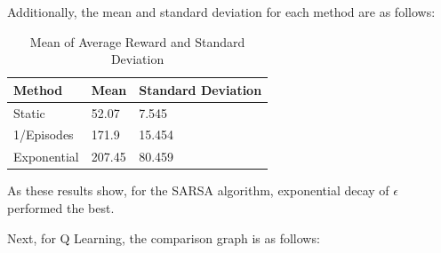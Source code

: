 Additionally, the mean and standard deviation for each method are as follows:

\begin{table}[H]
    \begin{tabular}{lll}
    \hline
    Method      & Mean   & Standard Deviation \\ \hline
    Static      & 52.07  & 7.545              \\
    1/Episodes  & 171.9  & 15.454             \\
    Exponential & 207.45 & 80.459             \\ \hline
    \end{tabular}
    \caption{Mean of Average Reward and Standard Deviation}
\end{table}

As these results show, for the SARSA algorithm, exponential decay of $\epsilon$ performed the best.

Next, for Q Learning, the comparison graph is as follows:





